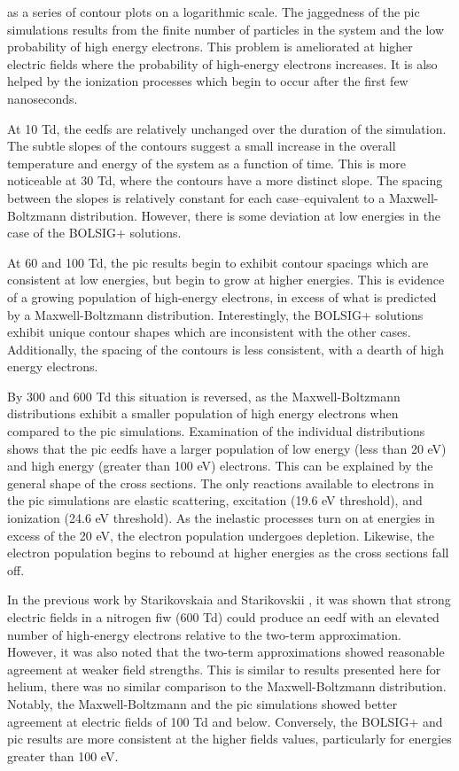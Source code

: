 as a series of contour plots on a logarithmic scale. The jaggedness of the
\acs{pic} simulations results from the finite number of particles in the system
and the low probability of high energy electrons. This problem is ameliorated at
higher electric fields where the probability of high-energy electrons increases.
It is also helped by the ionization processes which begin to occur after the
first few nanoseconds.

At 10 Td, the \acs{eedf}s are relatively unchanged over the duration of the
simulation. The subtle slopes of the contours suggest a small increase in the
overall temperature and energy of the system as a function of time. This is more
noticeable at 30 Td, where the contours have a more distinct slope. The spacing
between the slopes is relatively constant for each case--equivalent to a
Maxwell-Boltzmann distribution. However, there is some deviation at low energies
in the case of the BOLSIG+ solutions.

At 60 and 100 Td, the \acs{pic} results begin to exhibit contour spacings which
are consistent at low energies, but begin to grow at higher energies. This is
evidence of a growing population of high-energy electrons, in excess of what is
predicted by a Maxwell-Boltzmann distribution. Interestingly, the BOLSIG+
solutions exhibit unique contour shapes which are inconsistent with the other
cases. Additionally, the spacing of the contours is less consistent, with a
dearth of high energy electrons. 

By 300 and 600 Td this situation is reversed, as the Maxwell-Boltzmann
distributions exhibit a smaller population of high energy electrons when
compared to the \acs{pic} simulations. Examination of the individual
distributions shows that the \acs{pic} \acs{eedf}s have a larger population of
low energy (less than 20 eV) and high energy (greater than 100 eV) electrons.
This can be explained by the general shape of the cross sections. The only
reactions available to electrons in the \acs{pic} simulations are elastic
scattering, excitation (19.6 eV threshold), and ionization (24.6 eV threshold).
As the inelastic processes turn on at energies in excess of the 20 eV, the
electron population undergoes depletion. Likewise, the electron population
begins to rebound at higher energies as the cross sections fall off.

In the previous work by Starikovskaia and Starikovskii \cite{Starikovskaia2001},
it was shown that strong electric fields in a nitrogen \acs{fiw} (600 Td) could
produce an \acs{eedf} with an elevated number of high-energy electrons relative
to the two-term approximation. However, it was also noted that the two-term
approximations showed reasonable agreement at weaker field strengths. This is
similar to results presented here for helium, there was no similar comparison to
the Maxwell-Boltzmann distribution. Notably, the Maxwell-Boltzmann and the
\acs{pic} simulations showed better agreement at electric fields of 100 Td
and below. Conversely, the BOLSIG+ and \acs{pic} results are more consistent at
the higher fields values, particularly for energies greater than 100 eV.

